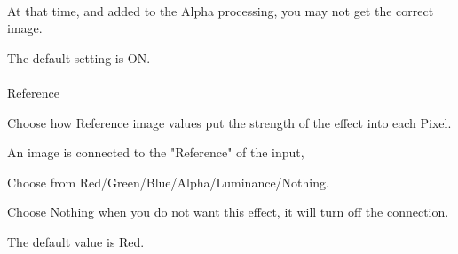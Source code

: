 \documentclass[a4paper,12pt]{article}
\begin{document}
\newpage

\thispagestyle{empty}

\ \vspace{-0.2em}
\par
At that time, and added to the Alpha processing, you may not get the correct image.\par
The default setting is ON.\\
\\
Reference\par
Choose how Reference image values put the strength of the effect into each Pixel.\par
An image is connected to the "Reference" of the input,\par
Choose from Red/Green/Blue/Alpha/Luminance/Nothing.\par
Choose Nothing when you do not want this effect, it will turn off the connection.\par
The default value is Red.
\end{document}
